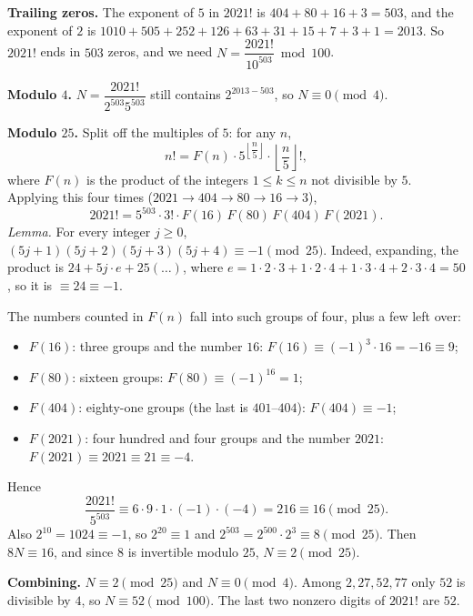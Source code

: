 \textbf{Trailing zeros.} The exponent of $5$ in $2021!$ is $404+80+16+3=503$, and the exponent of $2$ is $1010+505+252+126+63+31+15+7+3+1=2013$. So $2021!$ ends in $503$ zeros, and we need $N=\dfrac{2021!}{10^{503}}\bmod100$.

\textbf{Modulo $4$.} $N=\dfrac{2021!}{2^{503}5^{503}}$ still contains $2^{2013-503}$, so $N\equiv0\pmod4$.

\textbf{Modulo $25$.} Split off the multiples of $5$: for any $n$,
\[n!=F(n)\cdot5^{\left\lfloor \dfrac n5\right\rfloor}\cdot\left\lfloor\dfrac n5\right\rfloor!,\]
where $F(n)$ is the product of the integers $1\le k\le n$ not divisible by $5$. Applying this four times ($2021\to404\to80\to16\to3$),
\[2021!=5^{503}\cdot3!\cdot F(16)\,F(80)\,F(404)\,F(2021).\]
\emph{Lemma.} For every integer $j\ge0$, $(5j+1)(5j+2)(5j+3)(5j+4)\equiv-1\pmod{25}$. Indeed, expanding, the product is $24+5j\cdot e+25(\dots)$, where $e=1\cdot2\cdot3+1\cdot2\cdot4+1\cdot3\cdot4+2\cdot3\cdot4=50$, so it is $\equiv24\equiv-1$.

The numbers counted in $F(n)$ fall into such groups of four, plus a few left over:
\begin{itemize}
\item $F(16)$: three groups and the number $16$: $F(16)\equiv(-1)^3\cdot16=-16\equiv9$;
\item $F(80)$: sixteen groups: $F(80)\equiv(-1)^{16}=1$;
\item $F(404)$: eighty-one groups (the last is $401$--$404$): $F(404)\equiv-1$;
\item $F(2021)$: four hundred and four groups and the number $2021$: $F(2021)\equiv2021\equiv21\equiv-4$.
\end{itemize}
Hence
\[\dfrac{2021!}{5^{503}}\equiv6\cdot9\cdot1\cdot(-1)\cdot(-4)=216\equiv16\pmod{25}.\]
Also $2^{10}=1024\equiv-1$, so $2^{20}\equiv1$ and $2^{503}=2^{500}\cdot2^3\equiv8\pmod{25}$. Then $8N\equiv16$, and since $8$ is invertible modulo $25$, $N\equiv2\pmod{25}$.

\textbf{Combining.} $N\equiv2\pmod{25}$ and $N\equiv0\pmod4$. Among $2,27,52,77$ only $52$ is divisible by $4$, so $N\equiv52\pmod{100}$. The last two nonzero digits of $2021!$ are $\boxed{52}$.
